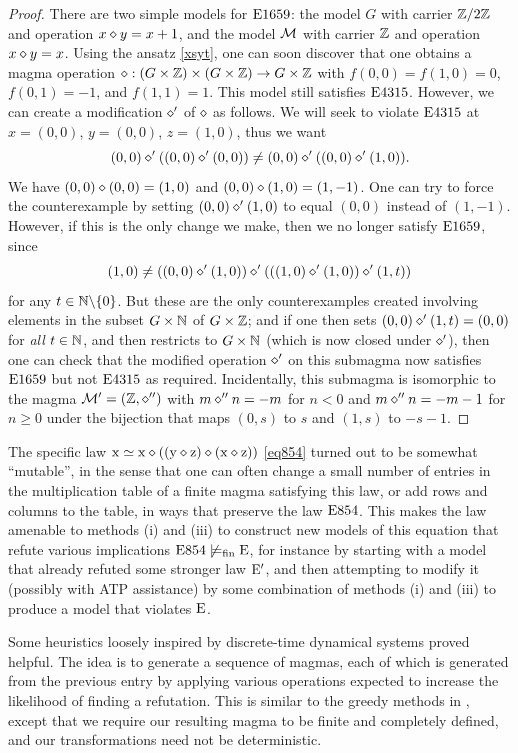 \begin{proof}  There are two simple models for $\mathrm{E}1659$: the model $G$ with carrier $\mathbb{Z}/2\mathbb{Z}$ and operation $x \diamond y = x+1$, and the model ${\mathcal{M}}$ with carrier $\mathbb{Z}$ and operation $x \diamond y = x$.  Using the ansatz \eqref{xsyt}, one can soon discover that one obtains a magma operation $\diamond: (G \times \mathbb{Z}) \times (G \times \mathbb{Z}) \to G \times \mathbb{Z}$ with $f(0,0)=f(1,0)=0$, $f(0,1)=-1$, and $f(1,1)=1$.  This model still satisfies $\mathrm{E}4315$. However, we can create a modification $\diamond'$ of $\diamond$ as follows.  We will seek to violate $\mathrm{E}4315$ at $x = (0,0)$, $y = (0,0)$, $z = (1,0)$, thus we want
$$ (0,0) \diamond' ((0,0) \diamond' (0,0)) \neq (0,0) \diamond' ((0,0) \diamond' (1,0)).$$
We have $(0,0) \diamond (0,0) = (1,0)$ and $(0,0) \diamond (1,0) = (1,-1)$.  One can try to force the counterexample by setting $(0,0) \diamond' (1,0)$ to equal $(0,0)$ instead of $(1,-1)$. However, if this is the only change we make, then we no longer satisfy $\mathrm{E}1659$, since
$$ (1,0) \neq ((0,0) \diamond' (1,0)) \diamond' (((1,0) \diamond' (1,0)) \diamond' (1,t))$$
for any $t \in \mathbb{N} \backslash \{0\}$. But these are the only counterexamples created involving elements in the subset $G \times \mathbb{N}$ of $G \times \mathbb{Z}$; and if one then sets $(0,0) \diamond' (1,t) = (0,0)$ for \emph{all} $t \in \mathbb{N}$, and then restricts to $G \times \mathbb{N}$ (which is now closed under $\diamond'$), then one can check that the modified operation $\diamond'$ on this submagma now satisfies $\mathrm{E}1659$ but not $\mathrm{E}4315$ as required.
Incidentally, this submagma is isomorphic to the magma ${\mathcal{M}}'=(\mathbb{Z},\diamond'')$ with $m\diamond''n=-m$ for $n<0$ and $m\diamond''n=-m-1$ for $n\geq 0$ under the bijection that maps $(0,s)$ to $s$ and $(1,s)$ to $-s-1$.
\end{proof}

The specific law $\mathrm{x} \simeq \mathrm{x} \diamond ((\mathrm{y} \diamond \mathrm{z}) \diamond (\mathrm{x} \diamond \mathrm{z}))$ \eqref{eq854} turned out to be somewhat ``mutable'', in the sense that one can often change a small number
 of entries in the multiplication table of a finite magma satisfying this law, or add rows and columns to the table,
 in ways that preserve the law $\mathrm{E}854$.  This makes the law amenable to methods (i) and (iii) to construct new models of this equation that
 refute various implications  $\mathrm{E}854 \not\models_{\mathrm{fin}} \mathrm{E}$, for instance by starting with a model that already refuted some stronger law ${\mathrm{E}'}$, and then attempting to modify it
 (possibly with ATP assistance) by some combination of methods (i) and (iii) to produce a model that violates $\mathrm{E}$.

 Some heuristics loosely inspired by discrete-time dynamical systems proved helpful.
 The idea is to generate a sequence of magmas, each of which is generated from the previous entry by applying various operations expected to increase the likelihood of
 finding a refutation.  This is similar to the greedy methods in , except that we require our resulting magma to be finite and completely
 defined, and our transformations need not be deterministic.

